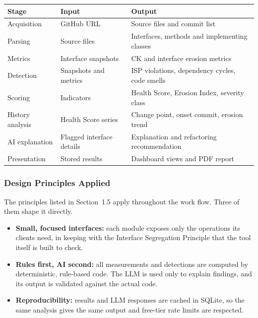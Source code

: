 \documentclass[12pt,a4paper]{article}
\begin{document}
\begin{table}[H]
\centering
\renewcommand{\arraystretch}{1.5}
\setlength{\tabcolsep}{6pt}

\begin{tabular}{|L{1.4in}|L{1.9in}|L{2.05in}|}
\hline
\textbf{Stage} & \textbf{Input} & \textbf{Output} \\
\hline
Acquisition & GitHub URL & Source files and commit list \\
\hline
Parsing & Source files & Interfaces, methods and implementing classes \\
\hline
Metrics & Interface snapshots & CK and interface erosion metrics \\
\hline
Detection & Snapshots and metrics & ISP violations, dependency cycles, code smells \\
\hline
Scoring & Indicators & Health Score, Erosion Index, severity class \\
\hline
History analysis & Health Score series & Change point, onset commit, erosion trend \\
\hline
AI explanation & Flagged interface details & Explanation and refactoring recommendation \\
\hline
Presentation & Stored results & Dashboard views and PDF report \\
\hline
\end{tabular}
\end{table}

\subsubsection{Design Principles Applied}

\begin{spacing}{1.5}
\justifying
The principles listed in Section~1.5 apply throughout the work flow. Three of
them shape it directly.

\begin{itemize}[leftmargin=*,itemsep=2pt]
  \item \textbf{Small, focused interfaces:} each module exposes only the
        operations its clients need, in keeping with the Interface
        Segregation Principle that the tool itself is built to check.

  \item \textbf{Rules first, AI second:} all measurements and detections
        are computed by deterministic, rule-based code. The LLM is used only
        to explain findings, and its output is validated against the actual
        code.

  \item \textbf{Reproducibility:} results and LLM responses are cached in
        SQLite, so the same analysis gives the same output and free-tier
        rate limits are respected.
\end{itemize}
\end{spacing}
\end{document}
